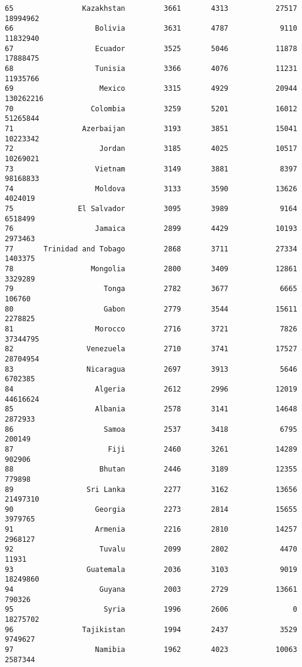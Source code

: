 \documentclass[
]{article}
\begin{document}
\begin{verbatim}
65                Kazakhstan         3661       4313           27517   18994962
66                   Bolivia         3631       4787            9110   11832940
67                   Ecuador         3525       5046           11878   17888475
68                   Tunisia         3366       4076           11231   11935766
69                    Mexico         3315       4929           20944  130262216
70                  Colombia         3259       5201           16012   51265844
71                Azerbaijan         3193       3851           15041   10223342
72                    Jordan         3185       4025           10517   10269021
73                   Vietnam         3149       3881            8397   98168833
74                   Moldova         3133       3590           13626    4024019
75               El Salvador         3095       3989            9164    6518499
76                   Jamaica         2899       4429           10193    2973463
77       Trinidad and Tobago         2868       3711           27334    1403375
78                  Mongolia         2800       3409           12861    3329289
79                     Tonga         2782       3677            6665     106760
80                     Gabon         2779       3544           15611    2278825
81                   Morocco         2716       3721            7826   37344795
82                 Venezuela         2710       3741           17527   28704954
83                 Nicaragua         2697       3913            5646    6702385
84                   Algeria         2612       2996           12019   44616624
85                   Albania         2578       3141           14648    2872933
86                     Samoa         2537       3418            6795     200149
87                      Fiji         2460       3261           14289     902906
88                    Bhutan         2446       3189           12355     779898
89                 Sri Lanka         2277       3162           13656   21497310
90                   Georgia         2273       2814           15655    3979765
91                   Armenia         2216       2810           14257    2968127
92                    Tuvalu         2099       2802            4470      11931
93                 Guatemala         2036       3103            9019   18249860
94                    Guyana         2003       2729           13661     790326
95                     Syria         1996       2606               0   18275702
96                Tajikistan         1994       2437            3529    9749627
97                   Namibia         1962       4023           10063    2587344

\end{verbatim}
\end{document}
